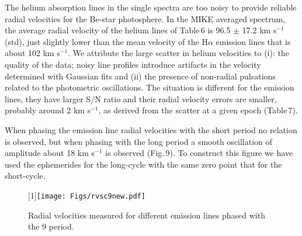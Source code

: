 \documentclass[useAMS,usenatbib]{mn2e}
\begin{document}
The helium absorption lines in the single spectra are too noisy to provide reliable radial velocities for the Be-star photosphere.
In the MIKE averaged spectrum, the average radial velocity of the helium lines of Table\,6 is 96.5 $\pm$ 17.2 km s$^{-1}$ (std), just slightly lower than the mean velocity of the H$\alpha$ emission lines that is about 102 km s$^{-1}$. We attribute the large scatter in helium velocities to  (i): the quality of the data; noisy line profiles introduce artifacts  in the velocity determined with Gaussian fits and (ii) the presence of non-radial pulsations related to the photometric oscillations.  The situation is different for the emission lines, they have larger S/N ratio and their radial velocity errors are smaller, probably around 2 km s$^{-1}$, as derived from the scatter at a given epoch (Table\,7).


When phasing the emission line radial velocities with the short period no relation is observed, but  when phasing with the long period a smooth oscillation of amplitude about 18 km s$^{-1}$  is observed (Fig.\,9).
To construct this figure we have used the ephemerides for the long-cycle with the same zero point that for the short-cycle.
 


 \begin{figure}
\scalebox{1}[1]{\texttt{[image: Figs/rvsc9new.pdf]}}
\caption{Radial velocities measured for different emission lines phased with the 9 period.
}
 \label{x}
\end{figure}
\end{document}
